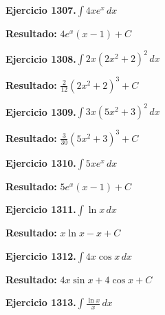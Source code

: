 \documentclass[10pt,a4paper]{article}
\begin{document}
\begin{ejbox}
\textbf{Ejercicio 1307.}\quad $\int 4x e^{x}\,dx$
\end{ejbox}

\begin{solbox}
\textbf{Resultado:} \(\displaystyle 4e^x(x-1) + C\)
\end{solbox}

\begin{ejbox}
\textbf{Ejercicio 1308.}\quad $\int 2x(2x^2 + 2)^{2}\,dx$
\end{ejbox}

\begin{solbox}
\textbf{Resultado:} \(\displaystyle \frac{2}{12}(2x^2+2)^{3} + C\)
\end{solbox}

\newpage
\begin{ejbox}
\textbf{Ejercicio 1309.}\quad $\int 3x(5x^2 + 3)^{2}\,dx$
\end{ejbox}

\begin{solbox}
\textbf{Resultado:} \(\displaystyle \frac{3}{30}(5x^2+3)^{3} + C\)
\end{solbox}

\begin{ejbox}
\textbf{Ejercicio 1310.}\quad $\int 5x e^{x}\,dx$
\end{ejbox}

\begin{solbox}
\textbf{Resultado:} \(\displaystyle 5e^x(x-1) + C\)
\end{solbox}

\begin{ejbox}
\textbf{Ejercicio 1311.}\quad $\int \ln x\,dx$
\end{ejbox}

\begin{solbox}
\textbf{Resultado:} \(\displaystyle x\ln x - x + C\)
\end{solbox}

\newpage
\begin{ejbox}
\textbf{Ejercicio 1312.}\quad $\int 4x \cos x\,dx$
\end{ejbox}

\begin{solbox}
\textbf{Resultado:} \(\displaystyle 4x\sin x + 4\cos x + C\)
\end{solbox}

\begin{ejbox}
\textbf{Ejercicio 1313.}\quad $\int \frac{\ln x}{x}\,dx$
\end{ejbox}
\end{document}
